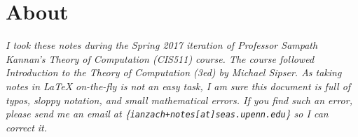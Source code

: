 




	
	
\vspace*{\fill}
\section*{About}
\textsl{{\Large I took these notes during the Spring 2017 iteration of Professor Sampath Kannan's Theory of Computation (CIS511) course.  The course followed \textit{Introduction to the Theory of Computation (3ed)} by Michael Sipser. As taking notes in \LaTeX\xspace on-the-fly is not an easy task, I am sure this document is full of typos, sloppy notation, and small mathematical errors.  If you find such an error, please send me an email at \{\texttt{ianzach+notes[at]seas.upenn.edu}\} so I can correct it.\\}}


\vspace*{1 in}
 
 \pagebreak





\pagebreak
\pagebreak
\pagebreak
\pagebreak
\pagebreak
\pagebreak
\pagebreak
\pagebreak
\pagebreak
\pagebreak
\pagebreak
\pagebreak
\pagebreak
\pagebreak
\pagebreak
\pagebreak
\pagebreak
\pagebreak
\pagebreak
\pagebreak
\pagebreak
\pagebreak
\pagebreak	
\pagebreak
\pagebreak
\pagebreak



	
